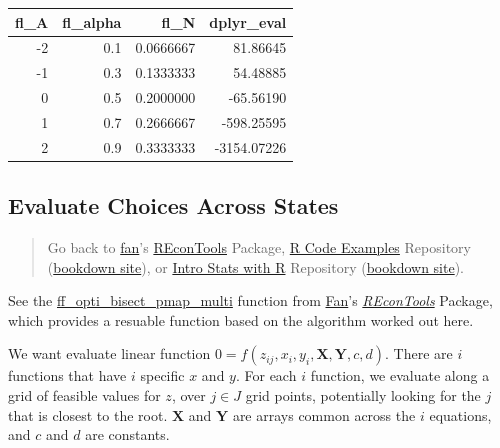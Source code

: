 \documentclass[
]{book}
\begin{document}
\begin{table}[!h]
\centering
\begin{tabular}{r|r|r|r}
\hline
fl\_A & fl\_alpha & fl\_N & dplyr\_eval\\
\hline
\rowcolor{gray!6}  -2 & 0.1 & 0.0666667 & 81.86645\\
\hline
-1 & 0.3 & 0.1333333 & 54.48885\\
\hline
\rowcolor{gray!6}  0 & 0.5 & 0.2000000 & -65.56190\\
\hline
1 & 0.7 & 0.2666667 & -598.25595\\
\hline
\rowcolor{gray!6}  2 & 0.9 & 0.3333333 & -3154.07226\\
\hline
\end{tabular}
\end{table}

\hypertarget{evaluate-choices-across-states}{%
\subsection{Evaluate Choices Across States}\label{evaluate-choices-across-states}}

\begin{quote}
Go back to \href{http://fanwangecon.github.io/}{fan}'s \href{https://fanwangecon.github.io/REconTools/}{REconTools} Package, \href{https://fanwangecon.github.io/R4Econ/}{R Code Examples} Repository (\href{https://fanwangecon.github.io/R4Econ/bookdown}{bookdown site}), or \href{https://fanwangecon.github.io/Stat4Econ/}{Intro Stats with R} Repository (\href{https://fanwangecon.github.io/Stat4Econ/bookdown}{bookdown site}).
\end{quote}

See the \href{https://fanwangecon.github.io/REconTools/reference/ff_opti_bisect_pmap_multi.html}{ff\_opti\_bisect\_pmap\_multi} function from \href{https://fanwangecon.github.io/}{Fan}'s \emph{\href{https://fanwangecon.github.io/REconTools/}{REconTools}} Package, which provides a resuable function based on the algorithm worked out here.

We want evaluate linear function \(0=f(z_{ij}, x_i, y_i, \textbf{X}, \textbf{Y}, c, d)\). There are \(i\) functions that have \(i\) specific \(x\) and \(y\). For each \(i\) function, we evaluate along a grid of feasible values for \(z\), over \(j\in J\) grid points, potentially looking for the \(j\) that is closest to the root. \(\textbf{X}\) and \(\textbf{Y}\) are arrays common across the \(i\) equations, and \(c\) and \(d\) are constants.
\end{document}
